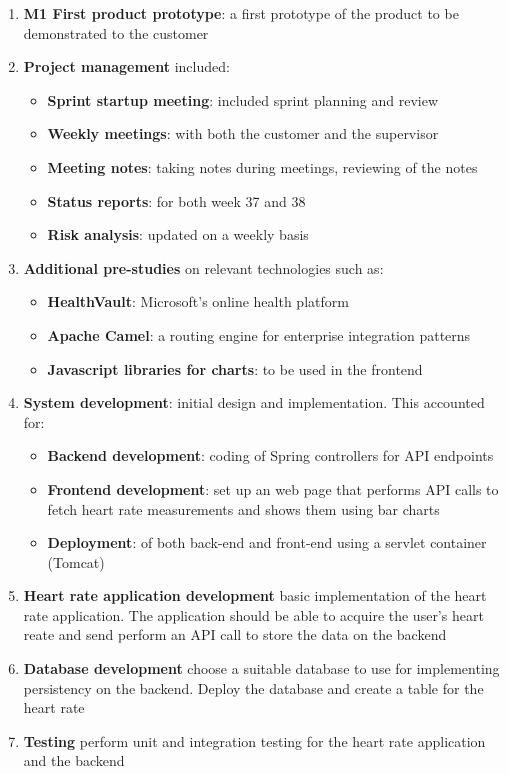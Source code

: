 \begin{enumerate}[1.]
	\item \textbf{M1 First product prototype}:\newline
		a first prototype of the product to be demonstrated to the customer
	\item \textbf{Project management} included:
		\begin{itemize}
			\item \textbf{Sprint startup meeting}:
				included sprint planning and review
			\item \textbf{Weekly meetings}:
				with both the customer and the supervisor
			\item \textbf{Meeting notes}:
				taking notes during meetings, reviewing of the notes
			\item \textbf{Status reports}:
				for both week 37 and 38
			\item \textbf{Risk analysis}:
				updated on a weekly basis
		\end{itemize}
	\item \textbf{Additional pre-studies} on relevant technologies such as:
	\begin{itemize}
		\item \textbf{HealthVault}: Microsoft's online health platform
		\item \textbf{Apache Camel}: a routing engine for enterprise integration patterns
		\item \textbf{Javascript libraries for charts}: to be used in the frontend
	\end{itemize}
	\item \textbf{System development}: initial design and implementation. This accounted for:
	\begin{itemize}
		\item \textbf{Backend development}:
			coding of Spring controllers for API endpoints
		\item \textbf{Frontend development}:
			set up an web page that performs API calls to fetch heart rate measurements
			and shows them using bar charts
		\item \textbf{Deployment}:
			of both back-end and front-end using a servlet container (Tomcat)
	\end{itemize}
	\item \textbf{Heart rate application development}\newline
		basic implementation of the heart rate application. The application should be able to acquire
		the user's heart reate and send perform an API call to store the data on the backend
	\item \textbf{Database development}\newline
		choose a suitable database to use for implementing persistency on the backend.
		Deploy the database and create a table for the heart rate
	\item \textbf{Testing}\newline
		perform unit and integration testing for the heart rate application and the backend
\end{enumerate}